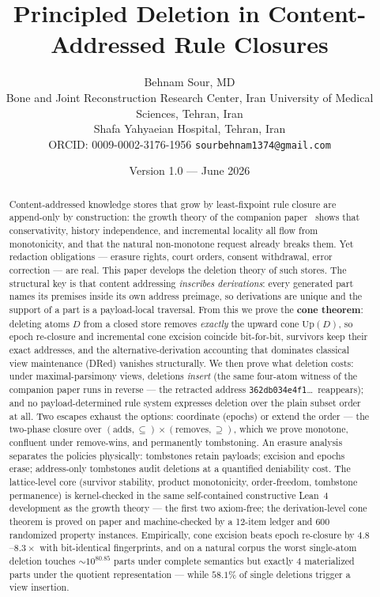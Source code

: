 \documentclass[11pt]{article}
\title{\textbf{Principled Deletion in Content-Addressed Rule Closures}}
\author{Behnam Sour, MD\\[2pt]
\small Bone and Joint Reconstruction Research Center, Iran University of Medical Sciences, Tehran, Iran\\
\small Shafa Yahyaeian Hospital, Tehran, Iran\\
\small ORCID: 0009-0002-3176-1956 \quad\textbar\quad \texttt{sourbehnam1374@gmail.com}}
\date{Version 1.0 --- June 2026}
\theoremstyle{definition}
\theoremstyle{remark}
\newcommand{\Up}{\mathrm{Up}}
\newcommand{\sub}{\subseteq}
\begin{document}
\maketitle

\begin{abstract}
\noindent
Content-addressed knowledge stores that grow by least-fixpoint rule closure are append-only by construction: the growth theory of the companion paper~\cite{growth} shows that conservativity, history independence, and incremental locality all flow from monotonicity, and that the natural non-monotone request already breaks them. Yet redaction obligations --- erasure rights, court orders, consent withdrawal, error correction --- are real. This paper develops the deletion theory of such stores. The structural key is that content addressing \emph{inscribes derivations}: every generated part names its premises inside its own address preimage, so derivations are unique and the support of a part is a payload-local traversal. From this we prove the \textbf{cone theorem}: deleting atoms $D$ from a closed store removes \emph{exactly} the upward cone $\Up(D)$, so epoch re-closure and incremental cone excision coincide bit-for-bit, survivors keep their exact addresses, and the alternative-derivation accounting that dominates classical view maintenance (DRed) vanishes structurally. We then prove what deletion costs: under maximal-parsimony views, deletions \emph{insert} (the same four-atom witness of the companion paper runs in reverse --- the retracted address \texttt{362db034e4f1}\ldots\ reappears); and no payload-determined rule system expresses deletion over the plain subset order at all. Two escapes exhaust the options: coordinate (epochs) or extend the order --- the two-phase closure over $(\text{adds},\sub)\times(\text{removes},\supseteq)$, which we prove monotone, confluent under remove-wins, and permanently tombstoning. An erasure analysis separates the policies physically: tombstones retain payloads; excision and epochs erase; address-only tombstones audit deletions at a quantified deniability cost. The lattice-level core (survivor stability, product monotonicity, order-freedom, tombstone permanence) is kernel-checked in the same self-contained constructive Lean~4 development as the growth theory --- the first two axiom-free; the derivation-level cone theorem is proved on paper and machine-checked by a 12-item ledger and 600 randomized property instances. Empirically, cone excision beats epoch re-closure by $4.8$--$8.3\times$ with bit-identical fingerprints, and on a natural corpus the worst single-atom deletion touches ${\sim}10^{80.85}$ parts under complete semantics but exactly $4$ materialized parts under the quotient representation --- while $58.1\%$ of single deletions trigger a view insertion.
\end{abstract}
\end{document}
